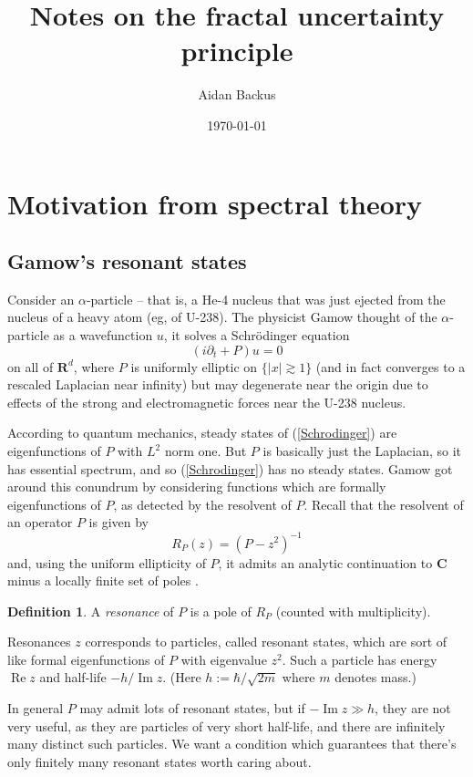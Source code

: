 \documentclass[reqno,12pt]{amsart}
\title{Notes on the fractal uncertainty principle}
\author{Aidan Backus}
\date{\today}
\newcommand{\RR}{\mathbf{R}}
\newcommand{\CC}{\mathbf{C}}
\newcommand{\dfn}[1]{\emph{#1}\index{#1}}
\renewcommand{\Re}{\operatorname{Re}}
\renewcommand{\Im}{\operatorname{Im}}
\theoremstyle{definition}
\newtheorem{definition}[theorem]{Definition}
\numberwithin{equation}{section}
\begin{document}
\maketitle

\tableofcontents 

\section{Motivation from spectral theory}
\subsection{Gamow's resonant states}
Consider an $\alpha$-particle -- that is, a He-4 nucleus that was just ejected from the nucleus of a heavy atom (eg, of U-238).
The physicist Gamow thought of the $\alpha$-particle as a wavefunction $u$, it solves a Schr\"odinger equation 
\begin{equation}\label{Schrodinger}
    (i\partial_t + P)u = 0
\end{equation}
on all of $\RR^d$, where $P$ is uniformly elliptic on $\{|x| \gtrsim 1\}$ (and in fact converges to a rescaled Laplacian near infinity) but may degenerate near the origin due to effects of the strong and electromagnetic forces near the U-238 nucleus.

According to quantum mechanics, steady states of (\ref{Schrodinger}) are eigenfunctions of $P$ with $L^2$ norm one.
But $P$ is basically just the Laplacian, so it has essential spectrum, and so (\ref{Schrodinger}) has no steady states.
Gamow got around this conundrum by considering functions which are formally eigenfunctions of $P$, as detected by the resolvent of $P$.
Recall that the resolvent of an operator $P$ is given by 
$$R_P(z) = (P - z^2)^{-1}$$
and, using the uniform ellipticity of $P$, it admits an analytic continuation to $\CC$ minus a locally finite set of poles \cite{dyatlov2019mathematical}.

\begin{definition}
    A \dfn{resonance} of $P$ is a pole of $R_P$ (counted with multiplicity).
\end{definition}

Resonances $z$ corresponds to particles, called resonant states, which are sort of like formal eigenfunctions of $P$ with eigenvalue $z^2$.
Such a particle has energy $\Re z$ and half-life $-h/\Im z$. (Here $h := \hbar/\sqrt{2m}$ where $m$ denotes mass.)

In general $P$ may admit lots of resonant states, but if $-\Im z \gg h$, they are not very useful, as they are particles of very short half-life, and there are infinitely many distinct such particles.
We want a condition which guarantees that there's only finitely many resonant states worth caring about.
\end{document}
